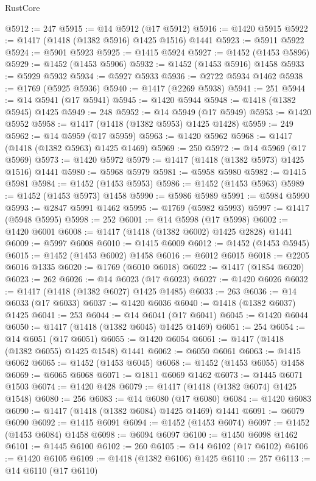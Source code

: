 \begin{lexlean}{RustCore}
\begin{coremodule}
@5912 := 247
@5915 := @14 @5912 (@17 @5912)
@5916 := @1420 @5915
@5922 := @1417 (@1418 (@1382 @5916) @1425 @1516) @1441
@5923 := @5911 @5922
@5924 := @5901 @5923
@5925 := @1415 @5924
@5927 := @1452 (@1453 @5896)
@5929 := @1452 (@1453 @5906)
@5932 := @1452 (@1453 @5916) @1458
@5933 := @5929 @5932
@5934 := @5927 @5933
@5936 := @2722 @5934 @1462
@5938 := @1769 (@5925 @5936)
@5940 := @1417 (@2269 @5938)
@5941 := 251
@5944 := @14 @5941 (@17 @5941)
@5945 := @1420 @5944
@5948 := @1418 (@1382 @5945) @1425
@5949 := 248
@5952 := @14 @5949 (@17 @5949)
@5953 := @1420 @5952
@5958 := @1417 (@1418 (@1382 @5953) @1425 @1428)
@5959 := 249
@5962 := @14 @5959 (@17 @5959)
@5963 := @1420 @5962
@5968 := @1417 (@1418 (@1382 @5963) @1425 @1469)
@5969 := 250
@5972 := @14 @5969 (@17 @5969)
@5973 := @1420 @5972
@5979 := @1417 (@1418 (@1382 @5973) @1425 @1516) @1441
@5980 := @5968 @5979
@5981 := @5958 @5980
@5982 := @1415 @5981
@5984 := @1452 (@1453 @5953)
@5986 := @1452 (@1453 @5963)
@5989 := @1452 (@1453 @5973) @1458
@5990 := @5986 @5989
@5991 := @5984 @5990
@5993 := @2847 @5991 @1462
@5995 := @1769 (@5982 @5993)
@5997 := @1417 (@5948 @5995)
@5998 := 252
@6001 := @14 @5998 (@17 @5998)
@6002 := @1420 @6001
@6008 := @1417 (@1418 (@1382 @6002) @1425 @2828) @1441
@6009 := @5997 @6008
@6010 := @1415 @6009
@6012 := @1452 (@1453 @5945)
@6015 := @1452 (@1453 @6002) @1458
@6016 := @6012 @6015
@6018 := @2205 @6016 @1335
@6020 := @1769 (@6010 @6018)
@6022 := @1417 (@1854 @6020)
@6023 := 262
@6026 := @14 @6023 (@17 @6023)
@6027 := @1420 @6026
@6032 := @1417 (@1418 (@1382 @6027) @1425 @1485)
@6033 := 263
@6036 := @14 @6033 (@17 @6033)
@6037 := @1420 @6036
@6040 := @1418 (@1382 @6037) @1425
@6041 := 253
@6044 := @14 @6041 (@17 @6041)
@6045 := @1420 @6044
@6050 := @1417 (@1418 (@1382 @6045) @1425 @1469)
@6051 := 254
@6054 := @14 @6051 (@17 @6051)
@6055 := @1420 @6054
@6061 := @1417 (@1418 (@1382 @6055) @1425 @1548) @1441
@6062 := @6050 @6061
@6063 := @1415 @6062
@6065 := @1452 (@1453 @6045)
@6068 := @1452 (@1453 @6055) @1458
@6069 := @6065 @6068
@6071 := @1811 @6069 @1462
@6073 := @1445 @6071 @1503
@6074 := @1420 @428
@6079 := @1417 (@1418 (@1382 @6074) @1425 @1548)
@6080 := 256
@6083 := @14 @6080 (@17 @6080)
@6084 := @1420 @6083
@6090 := @1417 (@1418 (@1382 @6084) @1425 @1469) @1441
@6091 := @6079 @6090
@6092 := @1415 @6091
@6094 := @1452 (@1453 @6074)
@6097 := @1452 (@1453 @6084) @1458
@6098 := @6094 @6097
@6100 := @1450 @6098 @1462
@6101 := @1445 @6100
@6102 := 260
@6105 := @14 @6102 (@17 @6102)
@6106 := @1420 @6105
@6109 := @1418 (@1382 @6106) @1425
@6110 := 257
@6113 := @14 @6110 (@17 @6110)

\end{coremodule}
\end{lexlean}

